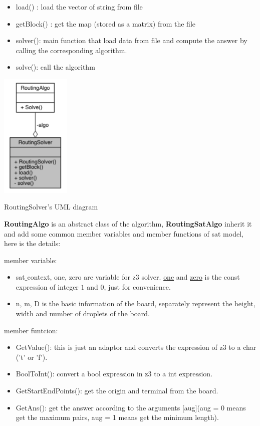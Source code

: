 \documentclass[twocolumn]{article}
\begin{document}
\begin{itemize}
    \item load() : load the vector of string from file
    \item getBlock() : get the map (stored as a matrix) from the file
    \item solver(): main function that load data from file and compute the answer by calling the corresponding algorithm.
    \item solve(): call the algorithm
\end{itemize}

\begin{center}
\makeatletter
\def\@captype{figure}
\makeatother
\includegraphics [height=6cm]{UMLRoutingSolver}
\caption{RoutingSolver's UML diagram}
\label{UMLRoutingSolver}
\end{center}

\textbf{RoutingAlgo} is an abstract class of the algorithm, \textbf{RoutingSatAlgo} inherit it and add some common member variables and member functions of sat model, here is the details:

member variable:

\begin{itemize}
    \item sat$\_$context, one, zero are variable for z3 solver. \underline{one} and \underline{zero} is the const expression of integer $1$ and $0$, just for convenience.
    \item n, m, D is the basic information of the board, separately represent the height, width and number of droplets of the board.
\end{itemize}

member funtcion:

\begin{itemize}
    \item GetValue(): this is just an adaptor and converts the expression of z3 to a char ('t' or 'f').
    \item BoolToInt(): convert a bool expression in z3 to a int expression.
    \item GetStartEndPoints(): get the origin and terminal from the board.
    \item GetAns(): get the answer according to the arguments [aug](aug = 0 means get the maximum pairs, aug = 1 means get the minimum length).
\end{itemize}
\end{document}
